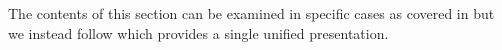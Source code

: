 \documentclass[12pt]{report}
\numberwithin{equation}{section}
\newtheorem{definition}[dummy]{Definition}
\begin{document}
	The contents of this section can be examined in specific cases as covered in \cite{Goerss_Jardine_2009} but we instead follow \cite{Riehl2011ALI} which provides a single unified presentation.
	
%	
%		
%		
	
\end{document}
